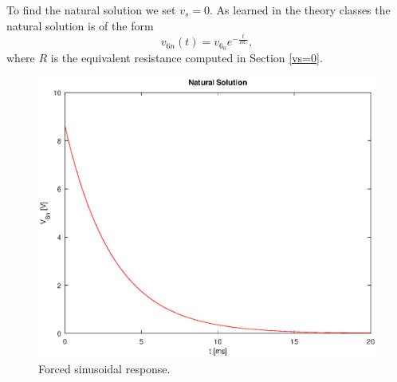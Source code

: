 To find the natural solution we set $v_{s}=0$.
As learned in the theory classes the natural solution is of the form
\begin{equation}
  v_{6n}(t) = v_{6_0}e^{-\frac{t}{RC}},
  \label{eq:vo_nat}
\end{equation}
where $R$ is the equivalent resistance computed in Section \ref{vs=0}. 


\begin{figure}[H] \centering
\includegraphics[width=0.8\linewidth]{nat_sol.eps}
\caption{Forced sinusoidal response.}
\label{fig:natural solution}
\end{figure}



